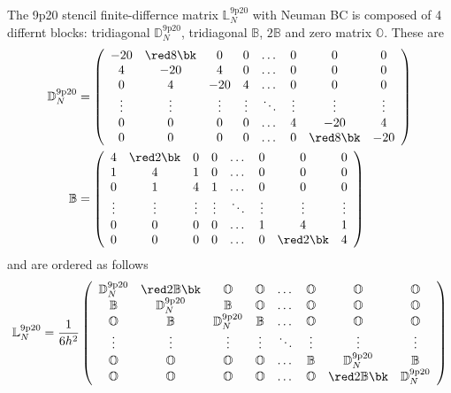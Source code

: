 The 9p20 stencil finite-differnce matrix $\mathbb{L}^{\mathrm{9p20}}_N$ with Neuman BC is composed of 4 differnt blocks: tridiagonal $\mathbb{D}^{\mathrm{9p20}}_N$, tridiagonal $\mathbb{B}$, $2\mathbb{B}$ and zero matrix $\mathbb{O}$. These are
\begin{align}
	\mathbb{D}^{\mathrm{9p20}}_N &= \left(\begin{array}{ccccccccc}
		-20 & \red 8\bk & 0&0& \dots&0&0 &0\\
		4&-20&4&0&\dots&0&0& 0\\
		0&4&-20&4 &\dots&0&0&0\\
		\vdots&\vdots&\vdots&\vdots&\ddots &\vdots&\vdots&\vdots\\
		0&0&0&0&\dots &4&-20&4 \\
		0&0&0&0&\dots &0&\red 8\bk&-20
	\end{array}\right) \\
	\mathbb{B} &= \left(\begin{array}{ccccccccc}
		4 & \red 2\bk & 0&0& \dots&0&0 &0\\
		1&4&1&0&\dots&0&0& 0\\
		0&1&4&1 &\dots&0&0&0\\
		\vdots&\vdots&\vdots&\vdots&\ddots &\vdots&\vdots&\vdots\\
		0&0&0&0&\dots &1&4&1 \\
		0&0&0&0&\dots &0&\red 2\bk&4
	\end{array}\right)
\end{align}
and are ordered as follows
\begin{equation}
	\mathbb{L}^{\mathrm{9p20}}_N = \frac{1}{6h^2}\left(\begin{array}{cccccccccc}
		\mathbb{D}^\mathrm{9p20}_N & \red 2\mathbb{B} \bk& \mathbb{O}&\mathbb{O}& \dots&\mathbb{O}&\mathbb{O} & \mathbb{O}\\
		\mathbb{B}&\mathbb{D}^\mathrm{9p20}_N & \mathbb{B} & \mathbb{O}& \dots&\mathbb{O}&\mathbb{O}&\mathbb{O}\\
		\mathbb{O}&\mathbb{B}&\mathbb{D}^\mathrm{9p20}_N & \mathbb{B} &  \dots&\mathbb{O}&\mathbb{O}&\mathbb{O}\\
		\vdots&\vdots&\vdots&\vdots&\ddots &\vdots&\vdots&\vdots\\
		\mathbb{O}&\mathbb{O}&\mathbb{O}&\mathbb{O}&\dots &\mathbb{B}&\mathbb{D}^\mathrm{9p20}_N & \mathbb{B} \\
		\mathbb{O}&\mathbb{O}&\mathbb{O}&\mathbb{O}&\dots &\mathbb{O}&\red 2\mathbb{B}\bk&\mathbb{D}^\mathrm{9p20}_N
	\end{array}\right)
\end{equation}    
